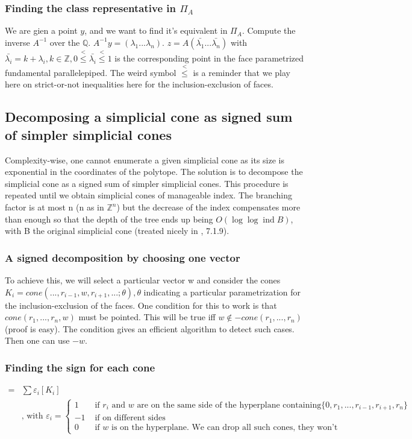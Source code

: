 \documentclass[14pt]{article}
\newcommand{\Q}{\mathbb{Q}}
\newcommand{\Z}{\mathbb{Z}}
\newcommand{\ltorle}{\overset{\scriptscriptstyle{<}}{\scriptscriptstyle{\le}}}
\newcommand{\ind}{\mathop{\mathrm{ind}}}
\begin{document}
\subsubsection*{Finding the class representative in $\Pi_A$}
We are gien a point $y$, and we want to find it's equivalent in $\Pi_A$.
Compute the inverse $A^{-1}$ over the $\Q$. $A^{-1} y = (\lambda_1 ... \lambda_n)$. $z = A (\bar{\lambda_1} ... \bar{\lambda_n})$ with $\bar{\lambda_i} = k + \lambda_i, k \in \Z, 0 \ltorle \bar{\lambda_i} \ltorle1$ is the corresponding point in the face parametrized fundamental parallelepiped.
The weird symbol $\ltorle$ is a reminder that we play here on strict-or-not inequalities here for the inclusion-exclusion of faces.




\subsection*{Decomposing a simplicial cone as signed sum of simpler simplicial cones}
Complexity-wise, one cannot enumerate a given simplicial cone as its size is exponential in the coordinates of the polytope.
The solution is to decompose the simplicial cone as a signed sum of simpler simplicial cones.
This procedure is repeated until we obtain simplicial cones of manageable index. The branching factor is at most n (n as in $\Z^n$) but the decrease of the index compensates more than enough so that the depth of the tree ends up being $O(\log \log \ind B)$, with B the original simplicial cone (treated nicely in \cite{DeLoera2012}, 7.1.9).

\subsubsection*{A signed decomposition by choosing one vector}
To achieve this, we will select a particular vector w and consider the cones $K_i = cone(...,r_{i-1}, w,r_{i+1},...; \theta), \theta$ indicating a particular parametrization for the inclusion-exclusion of the faces.
One condition for this to work is that $cone(r_1,..., r_n,w)$ must be pointed. This will be true iff $w \not\in -cone(r_1, ..., r_n)$ (proof is easy). The condition gives an efficient algorithm to detect such cases. Then one can use $-w$.
\\

\subsubsection*{Finding the sign for each cone}
\begin{align*}
  [K] =& \sum \varepsilon_i [K_i]\\
  &\text{, with }\varepsilon_i = \begin{cases}
    1 &\text{ if $r_i$ and $w$ are on the same side of the hyperplane containing}\{0, r_1,...,r_{i-1},r_{i+1},r_n\}\\
        -1&\text{ if on different sides}\\
        0&\text{ if $w$ is on the hyperplane. We can drop all such cones, they won't contribute}
  \end{cases}
\end{align*}
\end{document}
